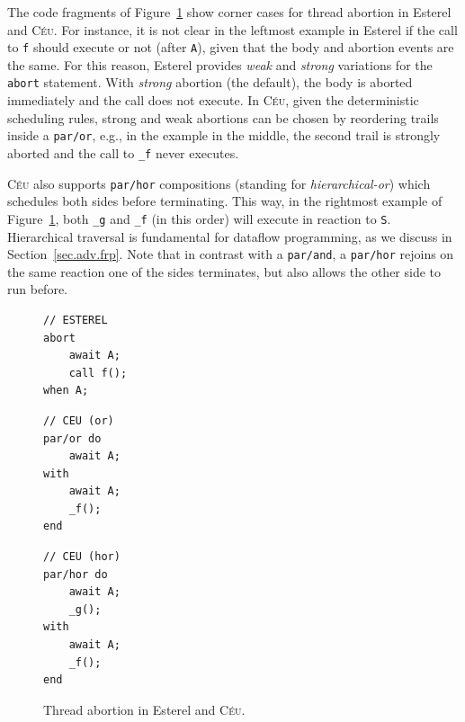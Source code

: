 \documentclass{acm_proc_article-sp}
\newcommand{\CEU}{\textsc{C\'{e}u}\xspace}
\newcommand{\code}[1] {{\small{\texttt{#1}}}}
\newcommand{\1}{\;}
\newcommand{\2}{\;\;}
\newcommand{\3}{\;\;\;}
\newcommand{\5}{\;\;\;\;\;}
\begin{document}
The code fragments of Figure~\ref{lst.abortion} show corner cases for thread 
abortion in Esterel and \CEU.
%
For instance, it is not clear in the leftmost example in Esterel if the call to 
\code{f} should execute or not (after \code{A}), given that the body and 
abortion events are the same.
%
For this reason, Esterel provides \emph{weak} and \emph{strong} variations for 
the \code{abort} statement.
With \emph{strong} abortion (the default), the body is aborted immediately and 
the call does not execute.
%
In \CEU, given the deterministic scheduling rules, strong and weak abortions 
can be chosen by reordering trails inside a \code{par/or}, e.g., in the example 
in the middle, the second trail is strongly aborted and the call to \code{\_f} 
never executes.

\CEU also supports \code{par/hor} compositions (standing for 
\emph{hierarchical-or}) which schedules both sides before terminating.
This way, in the rightmost example of Figure~\ref{lst.abortion}, both 
\code{\_g} and \code{\_f} (in this order) will execute in reaction to \code{S}.
Hierarchical traversal is fundamental for dataflow programming, as we discuss 
in Section~\ref{sec.adv.frp}.
Note that in contrast with a \code{par/and}, a \code{par/hor} rejoins on the 
same reaction one of the sides terminates, but also allows the other side to 
run before.

\begin{figure}[h]
\begin{minipage}[t]{0.32\linewidth}
\begin{lstlisting}
// ESTEREL
abort
    await A;
    call f();
when A;
\end{lstlisting}
\end{minipage}
%
\begin{minipage}[t]{0.32\linewidth}
\begin{lstlisting}
// CEU (or)
par/or do
    await A;
with
    await A;
    _f();
end
\end{lstlisting}
\end{minipage}
%
\begin{minipage}[t]{0.32\linewidth}
\begin{lstlisting}
// CEU (hor)
par/hor do
    await A;
    _g();
with
    await A;
    _f();
end
\end{lstlisting}
\end{minipage}
\caption{ Thread abortion in Esterel and \CEU. %
\label{lst.abortion}
}
\end{figure}
\end{document}
